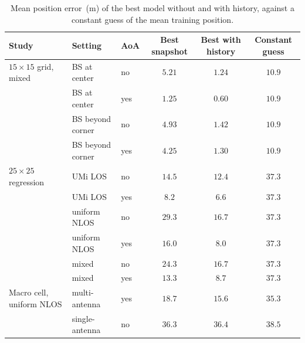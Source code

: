 \begin{table}[h]
  \centering
  \caption{Mean position error~(m) of the best model without and with history, against a constant guess of the mean training position.}
  \label{tab:cross-study}
  \small
  \begin{tabular}{@{}lllccc@{}}
    \toprule
    Study & Setting & AoA & Best snapshot & Best with history & Constant guess \\
    \midrule
    $15\times15$ grid, mixed & BS at center & no & $5.21$ & $1.24$ & $10.9$ \\
     & BS at center & yes & $1.25$ & $0.60$ & $10.9$ \\
     & BS beyond corner & no & $4.93$ & $1.42$ & $10.9$ \\
     & BS beyond corner & yes & $4.25$ & $1.30$ & $10.9$ \\
    \midrule
    $25\times25$ regression & UMi LOS & no & $14.5$ & $12.4$ & $37.3$ \\
     & UMi LOS & yes & $8.2$ & $6.6$ & $37.3$ \\
     & uniform NLOS & no & $29.3$ & $16.7$ & $37.3$ \\
     & uniform NLOS & yes & $16.0$ & $8.0$ & $37.3$ \\
     & mixed & no & $24.3$ & $16.7$ & $37.3$ \\
     & mixed & yes & $13.3$ & $8.7$ & $37.3$ \\
    \midrule
    Macro cell, uniform NLOS & multi-antenna & yes & $18.7$ & $15.6$ & $35.3$ \\
     & single-antenna & no & $36.3$ & $36.4$ & $38.5$ \\
    \bottomrule
  \end{tabular}
\end{table}

